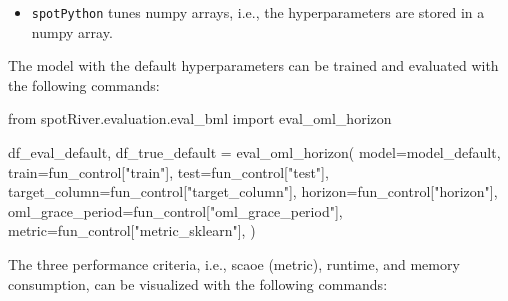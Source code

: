 \documentclass[
  letterpaper,
  DIV=11,
  numbers=noendperiod]{scrreprt}
\newenvironment{Shaded}{\begin{snugshade}}{\end{snugshade}}
\newcommand{\ImportTok}[1]{\textcolor[rgb]{0.00,0.46,0.62}{#1}}
\newcommand{\NormalTok}[1]{\textcolor[rgb]{0.00,0.23,0.31}{#1}}
\newcommand{\OperatorTok}[1]{\textcolor[rgb]{0.37,0.37,0.37}{#1}}
\newcommand{\StringTok}[1]{\textcolor[rgb]{0.13,0.47,0.30}{#1}}
\providecommand{\tightlist}{%
  \setlength{\itemsep}{0pt}\setlength{\parskip}{0pt}}\usepackage{longtable,booktabs,array}
\begin{document}
\begin{tcolorbox}[enhanced jigsaw, rightrule=.15mm, opacityback=0, colframe=quarto-callout-note-color-frame, opacitybacktitle=0.6, toptitle=1mm, arc=.35mm, colbacktitle=quarto-callout-note-color!10!white, coltitle=black, toprule=.15mm, leftrule=.75mm, titlerule=0mm, title=\textcolor{quarto-callout-note-color}{\faInfo}\hspace{0.5em}{Note: \texttt{spotPython} tunes numpy arrays}, bottomrule=.15mm, breakable, bottomtitle=1mm, left=2mm, colback=white]

\begin{itemize}
\tightlist
\item
  \texttt{spotPython} tunes numpy arrays, i.e., the hyperparameters are
  stored in a numpy array.
\end{itemize}

\end{tcolorbox}

The model with the default hyperparameters can be trained and evaluated
with the following commands:

\begin{Shaded}
\begin{Highlighting}[]
\ImportTok{from}\NormalTok{ spotRiver.evaluation.eval\_bml }\ImportTok{import}\NormalTok{ eval\_oml\_horizon}

\NormalTok{df\_eval\_default, df\_true\_default }\OperatorTok{=}\NormalTok{ eval\_oml\_horizon(}
\NormalTok{                    model}\OperatorTok{=}\NormalTok{model\_default,}
\NormalTok{                    train}\OperatorTok{=}\NormalTok{fun\_control[}\StringTok{"train"}\NormalTok{],}
\NormalTok{                    test}\OperatorTok{=}\NormalTok{fun\_control[}\StringTok{"test"}\NormalTok{],}
\NormalTok{                    target\_column}\OperatorTok{=}\NormalTok{fun\_control[}\StringTok{"target\_column"}\NormalTok{],}
\NormalTok{                    horizon}\OperatorTok{=}\NormalTok{fun\_control[}\StringTok{"horizon"}\NormalTok{],}
\NormalTok{                    oml\_grace\_period}\OperatorTok{=}\NormalTok{fun\_control[}\StringTok{"oml\_grace\_period"}\NormalTok{],}
\NormalTok{                    metric}\OperatorTok{=}\NormalTok{fun\_control[}\StringTok{"metric\_sklearn"}\NormalTok{],}
\NormalTok{                )}
\end{Highlighting}
\end{Shaded}

The three performance criteria, i.e., scaoe (metric), runtime, and
memory consumption, can be visualized with the following commands:
\end{document}
